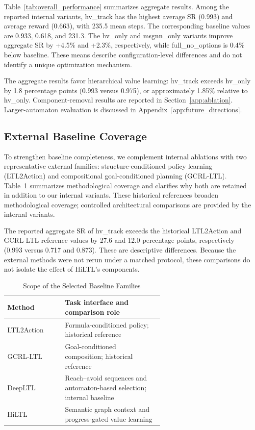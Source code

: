 \documentclass[journal]{IEEEtran}
\begin{document}
Table~\ref{tab:overall_performance} summarizes aggregate results. Among the reported internal variants, hv\_track has the highest average SR (0.993) and average reward (0.663), with 235.5 mean steps. The corresponding baseline values are 0.933, 0.618, and 231.3. The hv\_only and msgnn\_only variants improve aggregate SR by +4.5\% and +2.3\%, respectively, while full\_no\_options is 0.4\% below baseline. These means describe configuration-level differences and do not identify a unique optimization mechanism.

The aggregate results favor hierarchical value learning: hv\_track exceeds hv\_only by 1.8 percentage points (0.993 versus 0.975), or approximately 1.85\% relative to hv\_only. Component-removal results are reported in Section~\ref{app:ablation}. Larger-automaton evaluation is discussed in Appendix~\ref{app:future_directions}.

\subsection{External Baseline Coverage}

To strengthen baseline completeness, we complement internal ablations with two representative external families: structure-conditioned policy learning (LTL2Action) and compositional goal-conditioned planning (GCRL-LTL). Table~\ref{tab:baseline_completeness} summarizes methodological coverage and clarifies why both are retained in addition to our internal variants. These historical references broaden methodological coverage; controlled architectural comparisons are provided by the internal variants.

The reported aggregate SR of hv\_track exceeds the historical LTL2Action and GCRL-LTL reference values by 27.6 and 12.0 percentage points, respectively (0.993 versus 0.717 and 0.873). These are descriptive differences. Because the external methods were not rerun under a matched protocol, these comparisons do not isolate the effect of HiLTL's components.

\begin{table}[t]
\centering
\caption{Scope of the Selected Baseline Families}
\label{tab:baseline_completeness}
\begin{tabular}{@{}lp{0.63\linewidth}@{}}
\toprule
\textbf{Method} & \textbf{Task interface and comparison role} \\ \midrule
LTL2Action & Formula-conditioned policy; historical reference \\
GCRL-LTL & Goal-conditioned composition; historical reference \\
DeepLTL & Reach--avoid sequences and automaton-based selection; internal baseline \\
HiLTL & Semantic graph context and progress-gated value learning \\ \bottomrule
\end{tabular}
\end{table}
\end{document}
